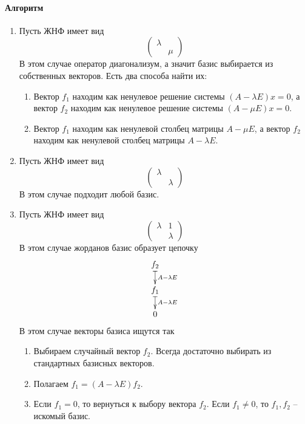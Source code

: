 \documentclass{article}
\begin{document}
\paragraph{Алгоритм}

\begin{enumerate}
\item Пусть ЖНФ имеет вид
\[
\begin{pmatrix}
{\lambda}&{}\\
{}&{\mu}
\end{pmatrix}
\]
В этом случае оператор диагонализум, а значит базис выбирается из собственных векторов.
Есть два способа найти их:
\begin{enumerate}
\item Вектор $f_1$ находим как ненулевое решение системы $(A- \lambda E) x = 0$, а вектор $f_2$ находим как ненулевое решение системы $(A - \mu E) x = 0$.

\item Вектор $f_1$ находим как ненулевой столбец матрицы $A - \mu E$, а вектор $f_2$ находим как ненулевой столбец матрицы $A-\lambda E$.
\end{enumerate}

\item Пусть ЖНФ имеет вид
\[
\begin{pmatrix}
{\lambda}&{}\\
{}&{\lambda}
\end{pmatrix}
\]
В этом случае подходит любой базис.

\item Пусть ЖНФ имеет вид
\[
\begin{pmatrix}
{\lambda}&{1}\\
{}&{\lambda}
\end{pmatrix}
\]
В этом случае жорданов базис образует цепочку
\[
\xymatrix@R=15pt@C=15pt{
  {f_2}\ar@{|->}[d]^{A-\lambda E}\\
  {f_1}\ar@{|->}[d]^{A-\lambda E}\\
  {0}
}
\]
В этом случае векторы базиса ищутся так
\begin{enumerate}
\item Выбираем случайный вектор $f_2$.
Всегда достаточно выбирать из стандартных базисных векторов.

\item Полагаем $f_1 = (A - \lambda E) f_2$.

\item Если $f_1 = 0$, то вернуться к выбору вектора $f_2$.
Если $f_1 \neq 0$, то $f_1, f_2$ -- искомый базис.
\end{enumerate}
\end{enumerate}
\end{document}
